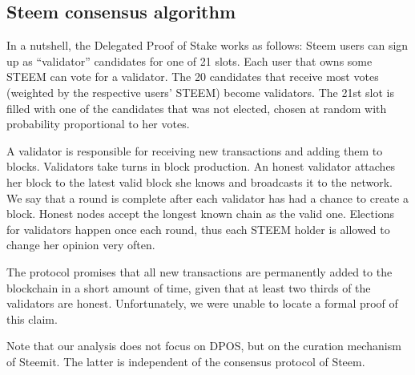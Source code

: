 



  \subsection{Steem consensus algorithm}
    In a nutshell, the Delegated Proof of Stake
    \cite{steemdpos,bitsharesdpos,steem} works as follows: Steem users can sign
    up as ``validator'' candidates for one of 21 slots. Each user that owns some
    STEEM can vote for a validator. The 20 candidates that receive most votes
    (weighted by the respective users' STEEM) become validators. The 21st slot
    is filled with one of the candidates that was not elected, chosen at random
    with probability proportional to her votes.

    A validator is responsible for receiving new transactions and adding them to
    blocks. Validators take turns in block production. An honest validator
    attaches her block to the latest valid block she knows and broadcasts it to
    the network. We say that a round is complete after each validator has had a
    chance to create a block. Honest nodes accept the longest known chain as the
    valid one. Elections for validators happen once each round, thus each STEEM
    holder is allowed to change her opinion very often.

    The protocol promises that all new transactions are permanently added to the
    blockchain in a short amount of time, given that at least two thirds of the
    validators are honest. Unfortunately, we were unable to locate a formal
    proof of this claim.

    Note that our analysis does not focus on DPOS, but on the curation mechanism
    of Steemit. The latter is independent of the consensus protocol of Steem.
